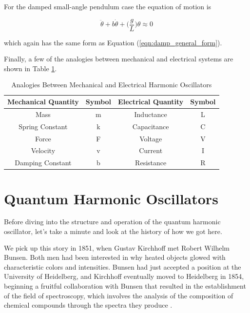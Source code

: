 \documentclass{article}
\theoremstyle{definition}
\begin{document}
\bigskip
\noindent
For the damped small-angle pendulum case the equation of motion is

\medskip
\begin{equation}
\ddot{\theta} + b \dot{\theta} + \bigg (\dfrac{g}{L} \bigg ) \theta \approx 0
\label{eqn:damped_pendulum}
\end{equation}

\medskip
\noindent
which again has the same form as Equation (\ref{eqn:damp_general_form}).

\bigskip
\noindent
Finally, a few of the analogies between mechanical
and electrical systems are shown in Table \ref{tab:analogies}.


\bigskip
\begin{table} [H]
  \centering
  \renewcommand{\arraystretch}{2.0}
     \resizebox{0.90 \textwidth}{!} {																	%
     \begin{tabular} {| c | c  | c | c |}
      \hline
      {\Large \bf Mechanical Quantity}  & {\Large \bf Symbol} & {\Large \bf Electrical Quantity} & {\Large \bf Symbol}\\
      \hline \hline
      Mass & m & Inductance & L\\
      \hline
      Spring Constant & k & Capacitance & C \\
      \hline
      Force & F & Voltage & V \\
      \hline
      Velocity & v & Current & I \\
      \hline
      Damping Constant & b & Resistance & R \\
      \hline
    \end{tabular}
   }
  \caption{Analogies Between Mechanical and Electrical Harmonic Oscillators}
  \label{tab:analogies}
\end{table}


\section{Quantum Harmonic Oscillators}
\label{sec:quantum_harmonic_oscillators}
Before diving into the structure and operation
of the quantum harmonic oscillator, let's take
a minute and look at the history of how we 
got here. 


\bigskip
\noindent
We pick up this story in 1851, when Gustav Kirchhoff met Robert
Wilhelm Bunsen.  Both men had been interested in why heated
objects glowed with characteristic colors and intensities. Bunsen
had just accepted a position at the University of Heidelberg, and
Kirchhoff eventually moved to Heidelberg in 1854, beginning a
fruitful collaboration with Bunsen that resulted in the
establishment of the field of spectroscopy, which involves the
analysis of the composition of chemical compounds through the
spectra they produce \cite{wiki:kirchoff, wiki:bunsen}.
\end{document}
